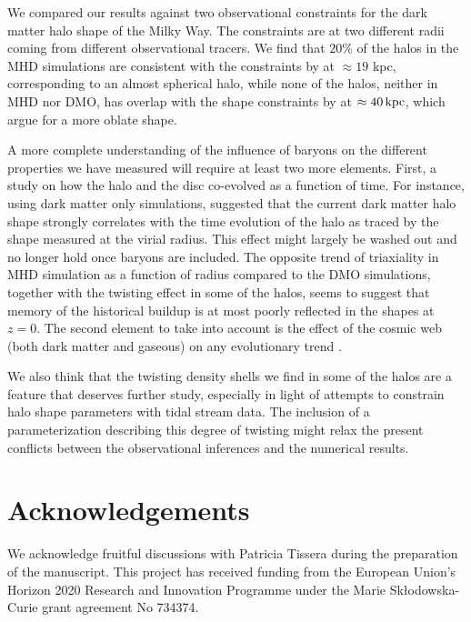 \documentclass[usenatbib]{mnras}
\begin{document}
We compared our results against two observational constraints for the
dark matter halo shape of the Milky Way. The constraints are at two different radii
coming from different observational tracers. 
We find that $20\%$ of the halos in the MHD simulations are consistent with
the constraints by \cite{Bovy16} at $\approx 19$ kpc,  corresponding to
an almost spherical halo, while none of the halos, neither in MHD nor
DMO, has overlap with the shape constraints by \cite{LM10} at
$\approx 40\,{\rm kpc}$, which argue for a more oblate shape.




A more complete understanding of the influence of baryons on the
different properties we have measured will require at least two more elements.
First, a study on how the halo and the disc co-evolved as a
function of time. 
For instance, using dark matter only simulations, \citet{VeraCiro11} suggested that
the current dark matter halo shape strongly correlates with the time
evolution of the halo as traced by the shape measured at the virial radius. 
This effect might largely be washed out and no longer hold once baryons are included. 
The opposite trend of triaxiality in MHD simulation as a function of
radius compared to the DMO simulations, together with the twisting effect in some of 
the halos, seems to suggest that memory of the historical buildup is at most poorly 
reflected in the shapes at $z=0$.
The second element to take into account is the effect of the cosmic web
(both dark matter and gaseous) on any evolutionary trend
\citep{2014MNRAS.443.1090F, 2017MNRAS.469..594B, 2019MNRAS.487.1607G}.

We also think  that the twisting density shells we find in
some of the halos are a feature that deserves further study, especially
in light of attempts to  constrain halo shape parameters with tidal stream data.  The
inclusion of a parameterization describing this degree of twisting
might relax the present conflicts between the observational inferences and the
numerical results.  


\section*{Acknowledgements}
We acknowledge fruitful discussions with Patricia Tissera during the
preparation of the manuscript.
This project has received funding from the European Union's Horizon
2020 Research and Innovation Programme under the Marie
Sk\l{}odowska-Curie grant agreement No 734374. 



\end{document}
